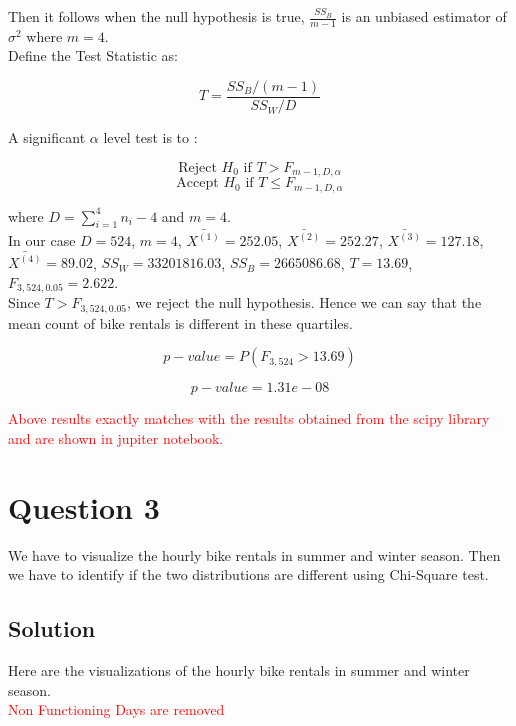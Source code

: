 \documentclass[12pt, letterpaper]{article}
\begin{document}
Then it follows when the null hypothesis is true, $\frac{SS_B}{m-1}$ is an unbiased estimator of $\sigma^2$ where $m=4$. \\

Define the Test Statistic as:

\[ \boxed{T= \frac{SS_B/(m-1)}{SS_W/D}} \]

A significant $\alpha$ level test is to :

\[ \text{Reject } H_0 \text{ if } T > F_{m-1,D,\alpha} \]
\[ \text{Accept } H_0 \text{ if } T \leq F_{m-1,D,\alpha} \]

where $D = \sum_{i=1}^{4} n_i - 4$ and $m=4$. \\

In our case $D = 524$, $m=4$, $\bar{X^{(1)}} = 252.05$, $\bar{X^{(2)}} = 252.27$, $\bar{X^{(3)}} = 127.18$, $\bar{X^{(4)}} = 89.02$, $SS_W = 33201816.03$, $SS_B =  2665086.68$, $T = 13.69$, $F_{3,524,0.05} = 2.622$. \\

Since $T > F_{3,524,0.05}$, we reject the null hypothesis. Hence we can say that the mean count of bike rentals is different in these quartiles.

\[ p-value = P(F_{3,524} > 13.69) \]

\[ \boxed{p-value =  1.31e-08} \]


\textcolor{red}{Above results exactly matches with the results obtained from the scipy library and are shown in jupiter notebook.}

\section*{Question 3}
We have to visualize the hourly bike rentals in summer and winter season. Then we have to identify if the two distributions are different using Chi-Square test.

\subsection*{Solution}
Here are the visualizations of the hourly bike rentals in summer and winter season. \\

\textcolor{red}{Non Functioning Days are removed}

\newpage
\end{document}
